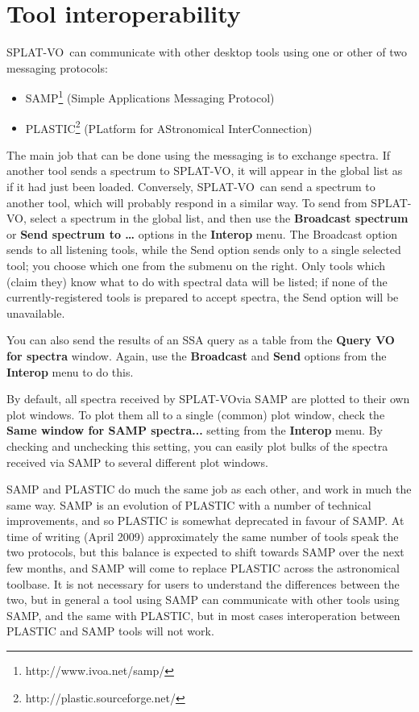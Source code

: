 \documentclass[twoside,11pt]{article}
\newcommand{\htmladdnormallinkfoot}[2]{#1\footnote{#2}}
\newcommand{\xlabel}[1]{}
\renewcommand{\_}{\texttt{\symbol{95}}}
\newcommand{\SPLAT}{\textsf{SPLAT-VO}}
\newcommand{\menuitem}[1]{\textbf{#1}}
\newcommand{\labelitem}[1]{\textbf{#1}}
\begin{document}
\newpage
\section{Tool interoperability\label{interop}\xlabel{interop}}

\SPLAT\ can communicate with other desktop tools
using one or other of two messaging protocols:
\begin{itemize}
\item \htmladdnormallinkfoot{SAMP}{http://www.ivoa.net/samp/}
      (Simple Applications Messaging Protocol)
\item \htmladdnormallinkfoot{PLASTIC}{http://plastic.sourceforge.net/}
      (PLatform for AStronomical InterConnection)
\end{itemize}

The main job that can be done using the messaging is to exchange spectra.
If another tool sends a spectrum to \SPLAT, it will appear in the
global list as if it had just been loaded.  Conversely, \SPLAT\ can send
a spectrum to another tool, which will probably respond in a similar way.
To send from \SPLAT, select a spectrum in the global list,
and then use the
\menuitem{Broadcast spectrum} or
\menuitem{Send spectrum to \ldots}
options in the \menuitem{Interop} menu.
The Broadcast option sends to all listening tools,
while the Send option sends only to a single selected tool;
you choose which one from the submenu on the right.
Only tools which (claim they) know what to do with spectral data
will be listed; if none of the currently-registered tools is
prepared to accept spectra, the Send option will be unavailable.

You can also send the results of an SSA query as a table from the
\labelitem{Query VO for spectra} window.  Again, use the
\menuitem{Broadcast} and \menuitem{Send} options from the
\menuitem{Interop} menu to do this.

By default, all spectra received by \SPLAT via SAMP are plotted to
their own plot windows. To plot them all to a single (common) plot 
window, check the \menuitem{Same window for SAMP spectra...} setting
from the \menuitem{Interop} menu. By checking and unchecking this
setting, you can easily plot bulks of the spectra received via
SAMP to several different plot windows.

SAMP and PLASTIC do much the same job as each other, and work in
much the same way.  SAMP is an evolution of PLASTIC with a number
of technical improvements, and so PLASTIC is somewhat deprecated
in favour of SAMP.  At time of writing (April 2009) approximately
the same number of tools speak the two protocols, but this balance
is expected to shift towards SAMP over the next few months, and
SAMP will come to replace PLASTIC across the astronomical toolbase.
It is not necessary for users to understand the differences between
the two, but in general a tool using SAMP can communicate with other
tools using SAMP, and the same with PLASTIC, but in most cases
interoperation between PLASTIC and SAMP tools will not work.
\end{document}
